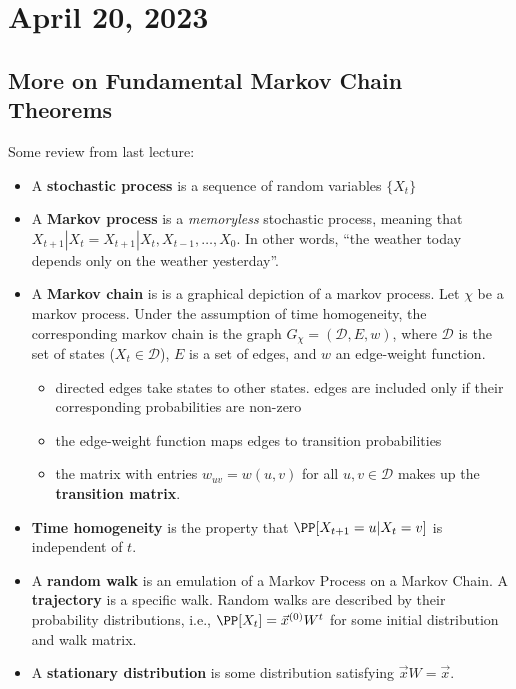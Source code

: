 \section{April 20, 2023}

\subsection{More on Fundamental Markov Chain Theorems}

Some review from last lecture:

\begin{itemize}
    \item A \textbf{stochastic process} is a sequence of random variables $\{X_t\}$
    \item A \textbf{Markov process} is a \textit{memoryless} stochastic process, meaning that $X_{t+1}|X_t = X_{t+1}|X_t, X_{t-1}, \hdots, X_0$. In other words, ``the weather today depends only on the weather yesterday''. 
    \item A \textbf{Markov chain} is is a graphical depiction of a markov process. Let $\chi$ be a markov process. Under the assumption of time homogeneity, the corresponding markov chain is the graph $G_{\chi} = (\mathcal{D}, E, w)$, where $\mathcal{D}$ is the set of states ($X_t\in \mathcal{D}$), $E$ is a set of edges, and $w$ an edge-weight function. 
    \begin{itemize}
        \item directed edges take states to other states. edges are included only if their corresponding probabilities are non-zero
        \item the edge-weight function maps edges to transition probabilities
        \item the matrix with entries $w_{uv}=w(u,v)$ for all $u,v\in \mathcal{D}$ makes up the \textbf{transition matrix}.
    \end{itemize} 
        \item \textbf{Time homogeneity} is the property that $\PP[X_{t+1}=u|X_t=v]$ is independent of $t$. 
    \item A \textbf{random walk} is an emulation of a Markov Process on a Markov Chain. A \textbf{trajectory} is a specific walk. Random walks are described by their probability distributions, i.e., $\PP[X_t]=\vec{x}^{(0)}W^t$ for some initial distribution and walk matrix.
    \item A \textbf{stationary distribution} is some distribution satisfying $\vec{x}W=\vec{x}$.
\end{itemize}

